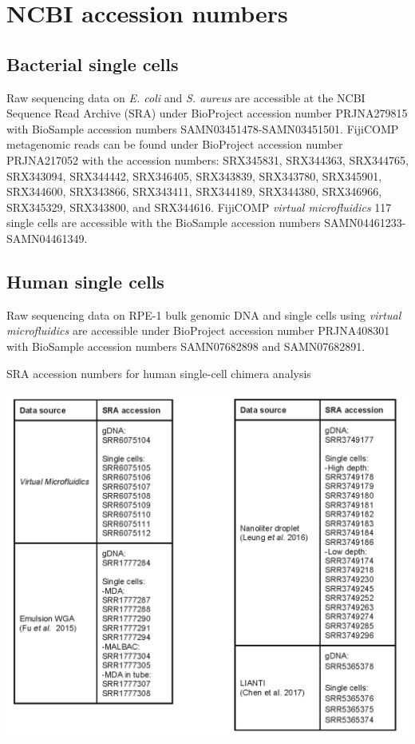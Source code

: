 \chapter{NCBI accession numbers}
\section{Bacterial single cells}
Raw sequencing data on \textit{E. coli} and \textit{S. aureus} are accessible at the NCBI Sequence Read Archive (SRA) under BioProject accession number PRJNA279815 with BioSample accession numbers SAMN03451478-SAMN03451501. FijiCOMP metagenomic reads can be found under BioProject accession number PRJNA217052 with the accession numbers: SRX345831, SRX344363, SRX344765, SRX343094, SRX344442, SRX346405, SRX343839, SRX343780, SRX345901, SRX344600, SRX343866, SRX343411, SRX344189, SRX344380, SRX346966, SRX345329, SRX343800, and SRX344616. FijiCOMP \textit{virtual microfluidics} 117 single cells are accessible with the BioSample accession numbers SAMN04461233-SAMN04461349.

\section{Human single cells}
Raw sequencing data on RPE-1 bulk genomic DNA and single cells using \textit{virtual microfluidics} are accessible under BioProject accession number PRJNA408301 with BioSample accession numbers SAMN07682898 and SAMN07682891. 

\begin{table}
\caption{SRA accession numbers for human single-cell chimera analysis}
\label{tab:SRAaccession}
\includegraphics[width=0.8\linewidth]{./figures/SRAaccession}
\end{table}

